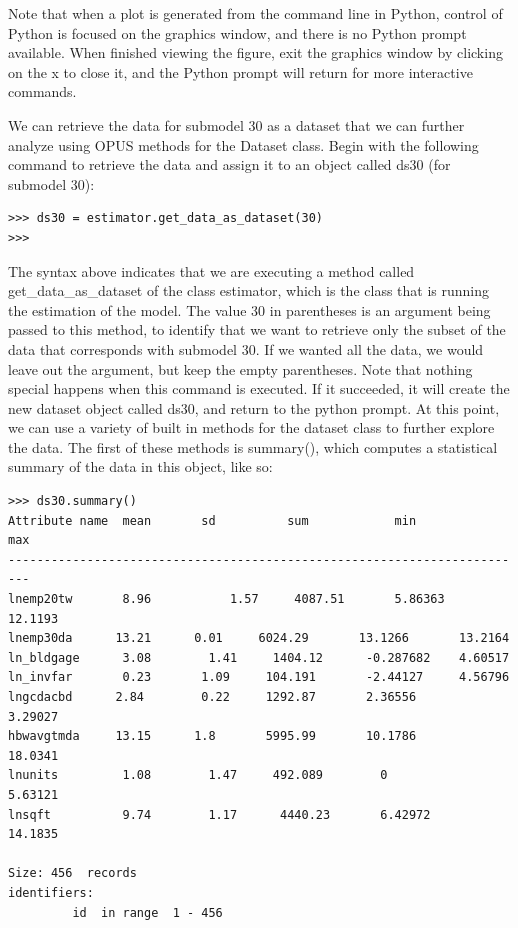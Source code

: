 Note that when a plot is generated from the command line in Python, control of Python is focused on the graphics window, and there is no Python prompt available.  When finished viewing the figure, exit the graphics window by clicking on the x to close it, and the Python prompt will return for more interactive commands.

We can retrieve the data for submodel 30 as a dataset that we can further analyze using OPUS methods for the Dataset class.  Begin with the following command to retrieve the data and assign it to an object called ds30 (for submodel 30):

\begin{lstlisting}
>>> ds30 = estimator.get_data_as_dataset(30)
>>>
\end{lstlisting}

The syntax above indicates that we are executing a method called get\_data\_as\_dataset of the class estimator, which is the class that is running the estimation of the model.  The value 30 in parentheses is an argument being passed to this method, to identify that we want to retrieve only the subset of the data that corresponds with submodel 30.  If we wanted all the data, we would leave out the argument, but keep the empty parentheses.  Note that nothing special happens when this command is executed.  If it succeeded, it will create the new dataset object called ds30, and return to the python prompt.  At this point, we can use a variety of built in methods for the dataset class to further explore the data.  The first of these methods is summary(), which computes a statistical summary of the data in this object, like so:\\

\begin{lstlisting}
>>> ds30.summary()
Attribute name	mean       sd	       sum            min             max
-------------------------------------------------------------------------
lnemp20tw       8.96	       1.57     4087.51       5.86363       12.1193
lnemp30da      13.21      0.01     6024.29       13.1266       13.2164
ln_bldgage      3.08        1.41     1404.12      -0.287682    4.60517
ln_invfar       0.23       1.09     104.191       -2.44127     4.56796
lngcdacbd      2.84        0.22     1292.87       2.36556       3.29027
hbwavgtmda     13.15      1.8       5995.99       10.1786       18.0341
lnunits         1.08        1.47     492.089        0            5.63121
lnsqft          9.74        1.17      4440.23       6.42972      14.1835

Size: 456  records
identifiers: 
         id  in range  1 - 456
\end{lstlisting}


